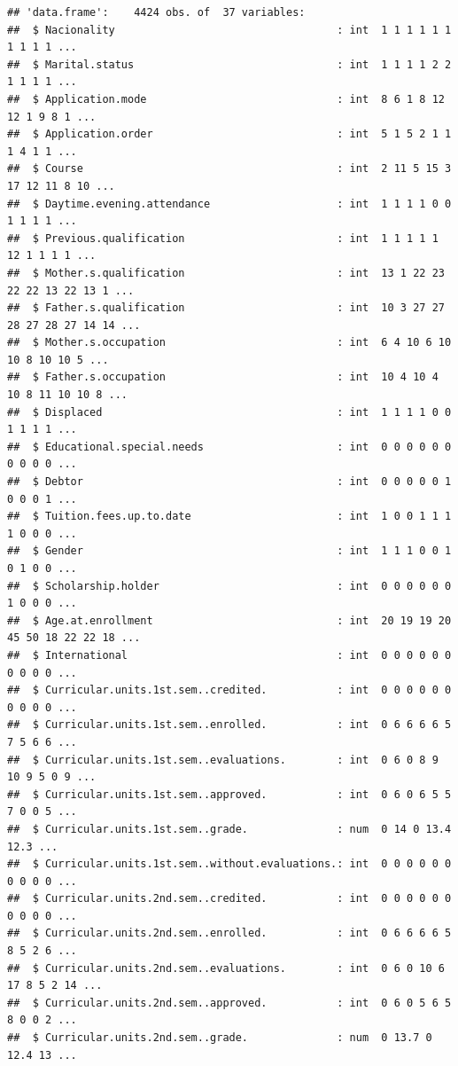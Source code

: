 \documentclass[
]{article}
\begin{document}
\begin{verbatim}
## 'data.frame':    4424 obs. of  37 variables:
##  $ Nacionality                                   : int  1 1 1 1 1 1 1 1 1 1 ...
##  $ Marital.status                                : int  1 1 1 1 2 2 1 1 1 1 ...
##  $ Application.mode                              : int  8 6 1 8 12 12 1 9 8 1 ...
##  $ Application.order                             : int  5 1 5 2 1 1 1 4 1 1 ...
##  $ Course                                        : int  2 11 5 15 3 17 12 11 8 10 ...
##  $ Daytime.evening.attendance                    : int  1 1 1 1 0 0 1 1 1 1 ...
##  $ Previous.qualification                        : int  1 1 1 1 1 12 1 1 1 1 ...
##  $ Mother.s.qualification                        : int  13 1 22 23 22 22 13 22 13 1 ...
##  $ Father.s.qualification                        : int  10 3 27 27 28 27 28 27 14 14 ...
##  $ Mother.s.occupation                           : int  6 4 10 6 10 10 8 10 10 5 ...
##  $ Father.s.occupation                           : int  10 4 10 4 10 8 11 10 10 8 ...
##  $ Displaced                                     : int  1 1 1 1 0 0 1 1 1 1 ...
##  $ Educational.special.needs                     : int  0 0 0 0 0 0 0 0 0 0 ...
##  $ Debtor                                        : int  0 0 0 0 0 1 0 0 0 1 ...
##  $ Tuition.fees.up.to.date                       : int  1 0 0 1 1 1 1 0 0 0 ...
##  $ Gender                                        : int  1 1 1 0 0 1 0 1 0 0 ...
##  $ Scholarship.holder                            : int  0 0 0 0 0 0 1 0 0 0 ...
##  $ Age.at.enrollment                             : int  20 19 19 20 45 50 18 22 22 18 ...
##  $ International                                 : int  0 0 0 0 0 0 0 0 0 0 ...
##  $ Curricular.units.1st.sem..credited.           : int  0 0 0 0 0 0 0 0 0 0 ...
##  $ Curricular.units.1st.sem..enrolled.           : int  0 6 6 6 6 5 7 5 6 6 ...
##  $ Curricular.units.1st.sem..evaluations.        : int  0 6 0 8 9 10 9 5 0 9 ...
##  $ Curricular.units.1st.sem..approved.           : int  0 6 0 6 5 5 7 0 0 5 ...
##  $ Curricular.units.1st.sem..grade.              : num  0 14 0 13.4 12.3 ...
##  $ Curricular.units.1st.sem..without.evaluations.: int  0 0 0 0 0 0 0 0 0 0 ...
##  $ Curricular.units.2nd.sem..credited.           : int  0 0 0 0 0 0 0 0 0 0 ...
##  $ Curricular.units.2nd.sem..enrolled.           : int  0 6 6 6 6 5 8 5 2 6 ...
##  $ Curricular.units.2nd.sem..evaluations.        : int  0 6 0 10 6 17 8 5 2 14 ...
##  $ Curricular.units.2nd.sem..approved.           : int  0 6 0 5 6 5 8 0 0 2 ...
##  $ Curricular.units.2nd.sem..grade.              : num  0 13.7 0 12.4 13 ...

\end{verbatim}
\end{document}
